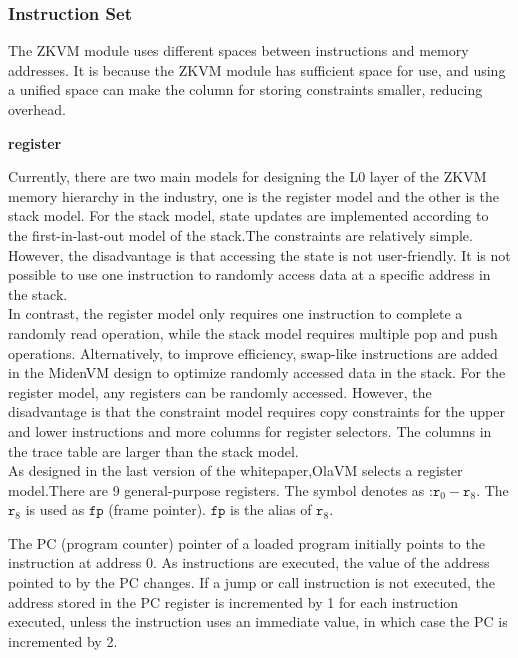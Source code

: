\subsubsection{Instruction Set} \label{subsec: instructions-set}

The ZKVM module uses different spaces between instructions and memory addresses.
It is because the ZKVM module has sufficient space for use,
and using a unified space can make the column for storing constraints smaller, reducing overhead.


\textbf{register} \label{subsubsec: zkvm-executor-register}

    Currently, there are two main models for designing the L0 layer of the ZKVM memory hierarchy in the industry, one is the register model and the other is the stack model.
For the stack model, state updates are implemented according to the first-in-last-out model of the stack.The constraints are relatively simple.
However, the disadvantage is that accessing the state is not user-friendly.
It is not possible to use one instruction to randomly access data at a specific address in the stack. \\
In contrast, the register model only requires one instruction to complete a randomly read operation, while the stack model requires multiple pop and push operations.
Alternatively, to improve efficiency, swap-like instructions are added in the MidenVM design to optimize randomly accessed data in the stack.
For the register model, any registers can be randomly accessed.
However, the disadvantage is that the constraint model requires copy constraints for the upper and lower instructions and more columns for register selectors.
The columns in the trace table are larger than the stack model. \\
    As designed in the last version of the whitepaper,OlaVM selects a register model.There are 9 general-purpose registers.
The symbol denotes as  :$\texttt{r}_0 - \texttt{r}_{8}$.
The $\texttt{r}_{8}$ is used as $\texttt{fp}$ (frame pointer). $\texttt{fp}$ is the alias of $\texttt{r}_{8}$.

The PC (program counter) pointer of a loaded program initially points to the instruction at address 0.
As instructions are executed, the value of the address pointed to by the PC changes.
If a jump or call instruction is not executed, the address stored in the PC register is incremented by 1 for each instruction executed, unless the instruction uses an immediate value, in which case the PC is incremented by 2.

